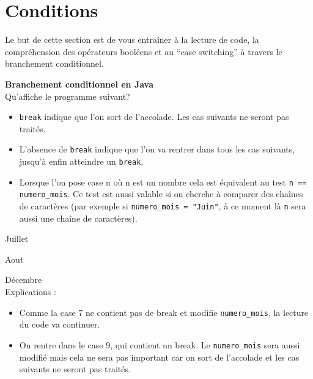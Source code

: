 \section{Conditions}
Le but de cette section est de vous entraîner à la lecture de code, la compréhension des opérateurs booléens et au ``case switching'' à travers le branchement conditionnel.
\\
\begin{Exercice}[10 minutes] \textbf{Branchement conditionnel en Java}\\
  Qu'affiche le programme suivant? 
  
  
   
    \begin{conseil}
      	\begin{itemize}
      		\item \lstinline{break} indique que l'on sort de l'accolade. Les cas suivants ne seront pas traités.
      		\item L'absence de \lstinline{break} indique que l'on va rentrer dans tous les cas suivants, jusqu'à enfin atteindre un \lstinline{break}.
      		\item Lorsque l'on pose case n où n est un nombre cela est équivalent au test \lstinline{n == numero_mois}. Ce test est aussi valable si on cherche à comparer des chaînes de caractères (par exemple si \lstinline{numero_mois = "Juin"}, à ce moment là \lstinline{n} sera aussi une chaîne de caractères).
      	\end{itemize}
        
    \end{conseil}
    \begin{solution}
    
    Juillet
    
	Aout
	
	Décembre \\
	
	Explications : \\
	
	\begin{itemize}
      		\item Comme la case 7 ne contient pas de break et modifie \lstinline{numero_mois}, la lecture du code va continuer.
      		\item On rentre dans le case 9, qui contient un break. Le \lstinline{numero_mois} sera aussi modifié mais cela ne sera pas important car on sort de l'accolade et les cas suivants ne seront pas traités.
      \end{itemize}
           
    \end{solution}   
\end{Exercice}

